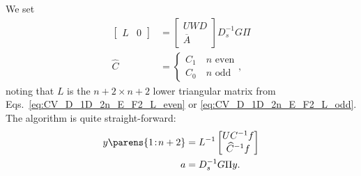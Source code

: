 We set
%
\begin{align}
    \begin{bmatrix} L & 0 \end{bmatrix}
        &= \begin{bmatrix} UWD \\ \overline{A} \end{bmatrix} D_{s}^{-1}G\Pi
        \nonumber\\
    \widehat{C} &= \begin{cases} C_{1} \quad n\text{ even} \\
        C_{0}\quad n\text{ odd} \end{cases},
\end{align}
%
noting that $L$ is the $n+2\times n+2$ lower triangular matrix
from Eqs.~\eqref{eq:CV_D_1D_2n_E_F2_L_even} or
\eqref{eq:CV_D_1D_2n_E_F2_L_odd}.
The algorithm is quite straight-forward:
%
\begin{align}
    y\parens{1\!:\!n+2} &= L^{-1}\begin{bmatrix} UC^{-1}f \\ \widehat{C}^{-1}f
        \end{bmatrix} \nonumber\\
    a &= D_{s}^{-1}G\Pi y.
\end{align}
%
